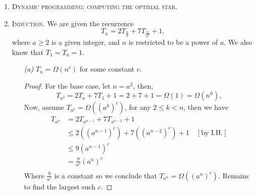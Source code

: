 \documentclass[12pt]{article}
\theoremstyle{definition}
\theoremstyle{remark}
\begin{document}
\begin{enumerate}
  \newpage 
  \item \textsc{Dynamic programming: computing the optimal star.}  
  \newpage  
  \item \textsc{Induction.} We are given the recurrence 
  $$T_n = 2 T_{\frac{n}{a}} + 7 T_{\frac{n}{a^2}} + 1,$$
  where $a \geq 2$ is a given integer, and $n$ is restricted to be a power of $a$. We also know that $T_1 = T_a = 1$.\newline
  \begin{enumerate}
    \item[\it (a)] $T_n = \Omega(n^c)$ for some constant $c.$
\begin{proof} For the base case, let $n = a^2$, then, 
  $$T_{a^2} = 2 T_a + 7T_1 + 1 = 2 + 7  + 1 = \Omega(1) = \Omega(n^0), $$
  Now, assume $T_{a^k} = \Omega ((a^k)^c)$, for any $2\leq k < n$, then we have 
  \begin{equation*}
    \begin{split}
      T_{a^n} &= 2 T_{a^{n-1}} + 7T_{a^{n-2}} + 1\\ 
      &\leq 2 ((a^{n-1})^c) + 7((a^{n-2})^c) + 1 \quad [\text{by I.H.}]\\ 
      & \leq 9 (a^{n-1})^c \\
      & = \frac{9}{a^c} \left( a^n\right)^c \\ 
    \end{split}
  \end{equation*}
  Where $\frac{9}{a^c} $ is a constant so we conclude that $T_{a^n} = \Omega ((a^n)^c)$. Remains to find the largest such $c.$ 
\end{proof}
  \end{enumerate}

\end{enumerate}
 
\end{document}
